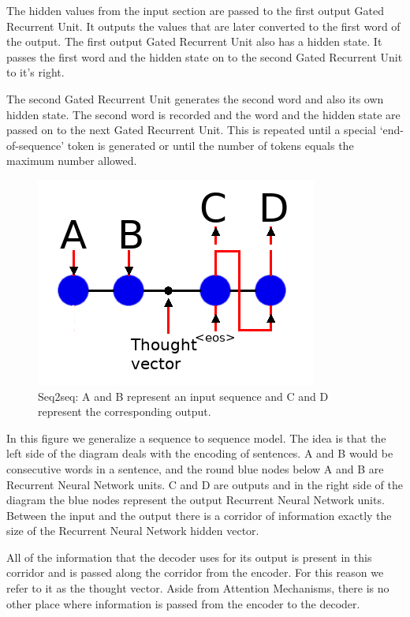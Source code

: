 The hidden values from the input section are passed to the first output Gated Recurrent Unit. It outputs the values that are later converted to the first word of the output. The first output Gated Recurrent Unit also has a hidden state. It passes the first word and the hidden state on to the second Gated Recurrent Unit to it's right.

The second Gated Recurrent Unit generates the second word and also its own hidden state. The second word is recorded and the word and the hidden state are passed on to the next Gated Recurrent Unit. This is repeated until a special `end-of-sequence' token is generated or until the number of tokens equals the maximum number allowed.

\begin{figure}[H]
	\begin{center}
	
	\includegraphics[scale=0.5]{diagram-nmt}
		
\end{center}
	\caption[Sequence to Sequence Architecture]{Seq2seq: A and B represent an input sequence and C and D represent the corresponding output.}
	

\end{figure}

In this figure we generalize a sequence to sequence model. The idea is that the left side of the diagram deals with the encoding of sentences. A and B would be consecutive words in a sentence, and the round blue nodes below A and B are Recurrent Neural Network units. C and D are outputs and in the right side of the diagram the blue nodes represent the output Recurrent Neural Network units. Between the input and the output there is a corridor of information exactly the size of the Recurrent Neural Network hidden vector. 

All of the information that the decoder uses for its output is present in this corridor and is passed along the corridor from the encoder. For this reason we refer to it as the thought vector. Aside from Attention Mechanisms, there is no other place where information is passed from the encoder to the decoder.

